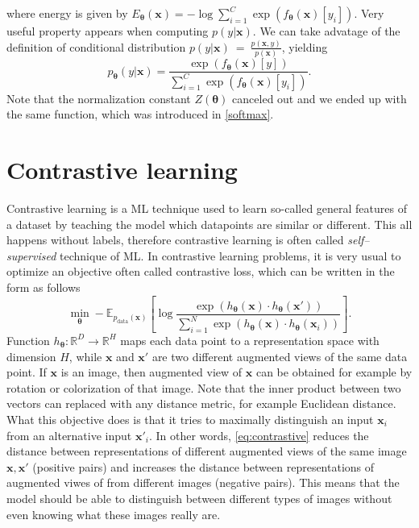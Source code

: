 where energy is given by $E_{\boldsymbol{\theta}}(\boldsymbol{x}) = -\log\sum_{i=1}^C\exp\left({f_{\boldsymbol{\theta}}\left(\boldsymbol{x}\right)[y_i]}\right)$. Very useful property appears when computing $p(y|\boldsymbol{x})$. We can take advatage of the definition of conditional distribution $p(y|\boldsymbol{x})~=~\frac{p\left(\boldsymbol{x},y\right)}{p\left(\boldsymbol{x}\right)}$, yielding  
\begin{equation}\label{softmaxdef}
	p_{\boldsymbol{\theta}}\left(y|\boldsymbol{x}\right) = \frac{\exp\left({f_{\boldsymbol{\theta}}\left(\boldsymbol{x}\right)[y]}\right)}{\sum_{i=1}^C\exp\left({f_{\boldsymbol{\theta}}\left(\boldsymbol{x}\right)[y_i]}\right)}.
\end{equation}
Note that the normalization constant $Z(\boldsymbol{\theta})$ canceled out and we ended up with the same function, which was introduced in \eqref{softmax}. 
\section{Contrastive learning}
 Contrastive learning \cite{contrastive1, contrastive2} is a ML technique used to learn so-called general features of a dataset by teaching the model which datapoints are similar or different. This all happens without labels, therefore contrastive learning is often called \emph{self--supervised} technique of ML.  In contrastive learning problems, it is very usual to optimize an objective often called contrastive loss, which can be written in the form as follows
\begin{equation}\label{eq:contrastive}
	\min_{\boldsymbol{\theta}}- \mathbb{E}_{p_{\mathrm{data}}(\boldsymbol{x})}\left[\log \frac{\exp\left({h_{\boldsymbol{\theta}}\left(\boldsymbol{x}\right)\cdot h_{\boldsymbol{\theta}}\left(\boldsymbol{x}'\right)}\right)}{\sum_{i=1}^N\exp\left({h_{\boldsymbol{\theta}}\left(\boldsymbol{x}\right)\cdot h_{\boldsymbol{\theta}}(\boldsymbol{x}_i) }\right)} \right].
\end{equation}
Function $h_{\boldsymbol{\theta}}: \mathbb{R}^D \to \mathbb{R}^H$ maps each data point to a representation space with dimension $H$, while $\boldsymbol{x}$ and $\boldsymbol{x}'$ are two different augmented views of the same data point. If $\boldsymbol{x}$ is an image, then augmented view of $\boldsymbol{x}$ can be obtained for example by rotation or colorization of that image. Note that the inner product between two vectors can replaced with any distance metric, for example Euclidean distance. \\
What this objective does is that it tries to maximally distinguish an input $\boldsymbol{x}_i$ from an alternative input $\boldsymbol{x}'_i$. In other words, \eqref{eq:contrastive} reduces the distance between representations of different augmented views of the same image $\boldsymbol{x}, \boldsymbol{x}'$ (positive pairs) and increases the distance between representations of augmented viwes of from different images (negative pairs). This means that the model should be able to distinguish between different types of images without even knowing what these images really are. 
